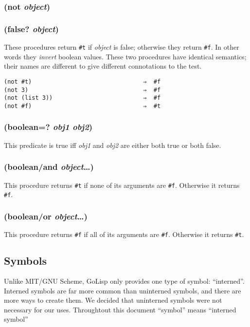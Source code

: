 \documentclass{article}
\begin{document}
\subsubsection{(not \emph{object})}

\subsubsection{(false? \emph{object})}

These procedures return \verb|#t| if \emph{object} is false; otherwise they return
\verb|#f|. In other words they \emph{invert} boolean values. These two procedures have
identical semantics; their names are different to give different connotations to the test.

\begin{verbatim}
(not #t)                                ⇒  #f
(not 3)                                 ⇒  #f
(not (list 3))                          ⇒  #f
(not #f)                                ⇒  #t
\end{verbatim}

\subsubsection{(boolean=? \emph{obj1} \emph{obj2})}

This predicate is true iff \emph{obj1} and \emph{obj2} are either both true or both false.

\subsubsection{(boolean/and \emph{object}\ldots{})}

This procedure returns \verb|#t| if none of its arguments are \verb|#f|.
Otherwise it returns \verb|#f|.

\subsubsection{(boolean/or \emph{object}\ldots{})}

This procedure returns \verb|#f| if all of its arguments are \verb|#f|.
Otherwise it returns \verb|#t|.

\subsection{Symbols}\label{sec:symbols}

Unlike MIT/GNU Scheme, GoLisp only provides one type of symbol: ``interned''. Interned symbols
are far more common than uninterned symbols, and there are more ways to create them. We
decided that uninterned symbols were not necessary for our uses. Throughtout this document
``symbol'' means ``interned symbol''
\end{document}
